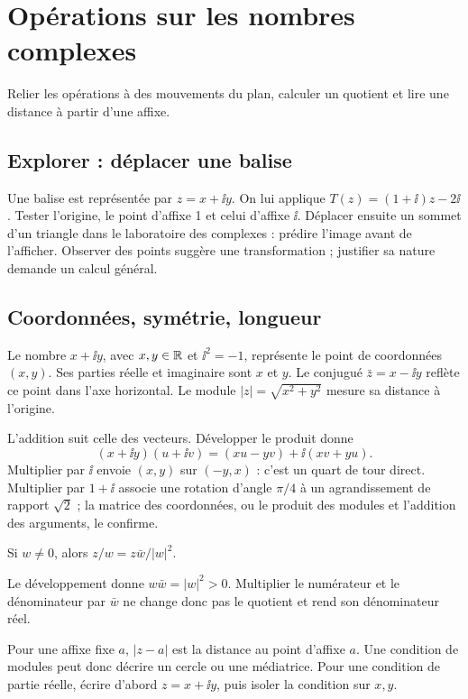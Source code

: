 \clearpage
\section{Opérations sur les nombres complexes}
\begin{objectif}
Relier les opérations à des mouvements du plan, calculer un quotient et lire une distance à partir d'une affixe.
\end{objectif}
\subsection{Explorer : déplacer une balise}
Une balise est représentée par $z=x+\ii y$. On lui applique $T(z)=(1+\ii)z-2\ii$. Tester l'origine, le point d'affixe 1 et celui d'affixe $\ii$. Déplacer ensuite un sommet d'un triangle dans le laboratoire des complexes : prédire l'image avant de l'afficher. Observer des points suggère une transformation ; justifier sa nature demande un calcul général.
\subsection{Coordonnées, symétrie, longueur}
\begin{definition}[affixe]
Le nombre $x+\ii y$, avec $x,y\in\mathbb{R}$ et $\ii^2=-1$, représente le point de coordonnées $(x,y)$. Ses parties réelle et imaginaire sont $x$ et $y$. Le conjugué $\bar z=x-\ii y$ reflète ce point dans l'axe horizontal. Le module $|z|=\sqrt{x^2+y^2}$ mesure sa distance à l'origine.
\end{definition}
L'addition suit celle des vecteurs. Développer le produit donne
\[(x+\ii y)(u+\ii v)=(xu-yv)+\ii(xv+yu).\]
Multiplier par $\ii$ envoie $(x,y)$ sur $(-y,x)$ : c'est un quart de tour direct. Multiplier par $1+\ii$ associe une rotation d'angle $\pi/4$ à un agrandissement de rapport $\sqrt2$ ; la matrice des coordonnées, ou le produit des modules et l'addition des arguments, le confirme.
\begin{propriete}[quotient]
Si $w\ne0$, alors $z/w=z\bar w/|w|^2$.
\end{propriete}
\begin{demonstration}
Le développement donne $w\bar w=|w|^2>0$. Multiplier le numérateur et le dénominateur par $\bar w$ ne change donc pas le quotient et rend son dénominateur réel.
\end{demonstration}
\begin{methode}
Pour une affixe fixe $a$, $|z-a|$ est la distance au point d'affixe $a$. Une condition de modules peut donc décrire un cercle ou une médiatrice. Pour une condition de partie réelle, écrire d'abord $z=x+\ii y$, puis isoler la condition sur $x,y$.
\end{methode}
